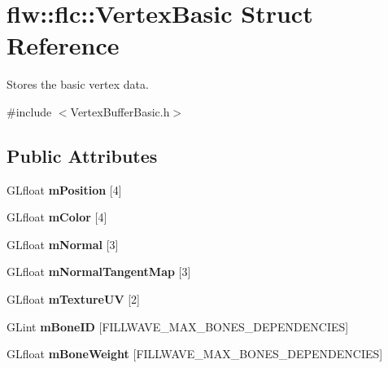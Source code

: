 \hypertarget{structflw_1_1flc_1_1VertexBasic}{}\section{flw\+:\+:flc\+:\+:Vertex\+Basic Struct Reference}
\label{structflw_1_1flc_1_1VertexBasic}


Stores the basic vertex data.  




{\ttfamily \#include $<$Vertex\+Buffer\+Basic.\+h$>$}

\subsection*{Public Attributes}
\begin{DoxyCompactItemize}
\item 
G\+Lfloat {\bfseries m\+Position} \mbox{[}4\mbox{]}\hypertarget{structflw_1_1flc_1_1VertexBasic_a6bde6807f2a22bfb9478f504e2efb27a}{}\label{structflw_1_1flc_1_1VertexBasic_a6bde6807f2a22bfb9478f504e2efb27a}

\item 
G\+Lfloat {\bfseries m\+Color} \mbox{[}4\mbox{]}\hypertarget{structflw_1_1flc_1_1VertexBasic_a673ee06143a4bd1a30e79eb8eb55d26f}{}\label{structflw_1_1flc_1_1VertexBasic_a673ee06143a4bd1a30e79eb8eb55d26f}

\item 
G\+Lfloat {\bfseries m\+Normal} \mbox{[}3\mbox{]}\hypertarget{structflw_1_1flc_1_1VertexBasic_ae280f116e8c4f7755f26320ccbe1f324}{}\label{structflw_1_1flc_1_1VertexBasic_ae280f116e8c4f7755f26320ccbe1f324}

\item 
G\+Lfloat {\bfseries m\+Normal\+Tangent\+Map} \mbox{[}3\mbox{]}\hypertarget{structflw_1_1flc_1_1VertexBasic_a803015d2ceadcca113258979fad2cea6}{}\label{structflw_1_1flc_1_1VertexBasic_a803015d2ceadcca113258979fad2cea6}

\item 
G\+Lfloat {\bfseries m\+Texture\+UV} \mbox{[}2\mbox{]}\hypertarget{structflw_1_1flc_1_1VertexBasic_afa57fa772a09fcc3d2fa2e27d38f052b}{}\label{structflw_1_1flc_1_1VertexBasic_afa57fa772a09fcc3d2fa2e27d38f052b}

\item 
G\+Lint {\bfseries m\+Bone\+ID} \mbox{[}F\+I\+L\+L\+W\+A\+V\+E\+\_\+\+M\+A\+X\+\_\+\+B\+O\+N\+E\+S\+\_\+\+D\+E\+P\+E\+N\+D\+E\+N\+C\+I\+ES\mbox{]}\hypertarget{structflw_1_1flc_1_1VertexBasic_af7b944599da3a1ccda716346a1637703}{}\label{structflw_1_1flc_1_1VertexBasic_af7b944599da3a1ccda716346a1637703}

\item 
G\+Lfloat {\bfseries m\+Bone\+Weight} \mbox{[}F\+I\+L\+L\+W\+A\+V\+E\+\_\+\+M\+A\+X\+\_\+\+B\+O\+N\+E\+S\+\_\+\+D\+E\+P\+E\+N\+D\+E\+N\+C\+I\+ES\mbox{]}\hypertarget{structflw_1_1flc_1_1VertexBasic_ad9ce3257df1a3ff6a7664a7760f2586c}{}\label{structflw_1_1flc_1_1VertexBasic_ad9ce3257df1a3ff6a7664a7760f2586c}

\end{DoxyCompactItemize}


